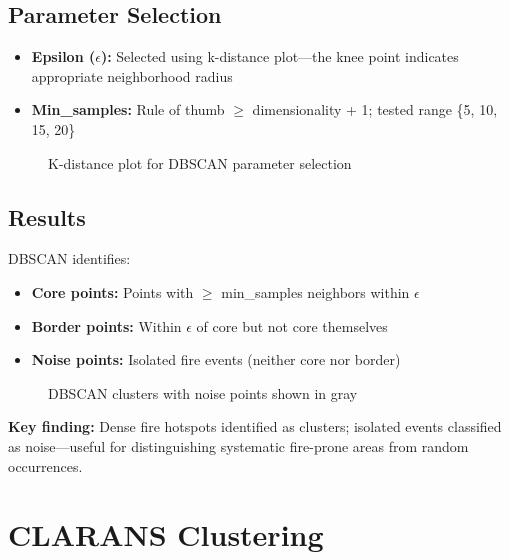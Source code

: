 \subsection*{Parameter Selection}
\begin{itemize}
    \item \textbf{Epsilon ($\epsilon$):} Selected using k-distance plot---the knee point indicates appropriate neighborhood radius
    \item \textbf{Min\_samples:} Rule of thumb $\geq$ dimensionality + 1; tested range \{5, 10, 15, 20\}
\end{itemize}

\begin{figure}[H]
    \centering
    \caption{K-distance plot for DBSCAN parameter selection}
    \label{fig:dbscan_kdist}
\end{figure}

\subsection*{Results}
DBSCAN identifies:
\begin{itemize}
    \item \textbf{Core points:} Points with $\geq$ min\_samples neighbors within $\epsilon$
    \item \textbf{Border points:} Within $\epsilon$ of core but not core themselves
    \item \textbf{Noise points:} Isolated fire events (neither core nor border)
\end{itemize}

\begin{figure}[H]
    \centering
    \caption{DBSCAN clusters with noise points shown in gray}
    \label{fig:dbscan_map}
\end{figure}

\textbf{Key finding:} Dense fire hotspots identified as clusters; isolated events classified as noise---useful for distinguishing systematic fire-prone areas from random occurrences.

\section{CLARANS Clustering}

